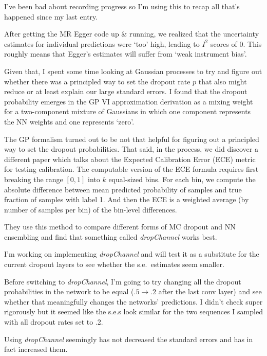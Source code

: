 \begin{Minutes}{}
\maketitle
{}
I've been bad about recording progress so I'm using this to recap all that's happened since my last entry.

After getting the MR Egger code up \& running, we realized that the uncertainty estimates for individual predictions were `too' high, leading to \( I^2 \) scores of 0. This roughly means that Egger's estimates will suffer from `weak instrument bias'.

Given that, I spent some time looking at Gaussian processes to try and figure out whether there was a principled way to set the dropout rate \( p \) that also might reduce or at least explain our large standard errors. I found that the dropout probability emerges in the GP VI approximation derivation as a mixing weight for a two-component mixture of Gaussians in which one component represents the NN weights and one represents `zero'.

The GP formalism turned out to be not that helpful for figuring out a principled way to set the dropout probabilities. That said, in the process, we did discover a different paper which talks about the Expected Calibration Error (ECE) metric for testing calibration. The computable version of the ECE formula requires first breaking the range \( [0, 1] \) into \( k \) equal-sized bins. For each bin, we compute the absolute difference between mean predicted probability of samples and true fraction of samples with label 1. And then the ECE is a weighted average (by number of samples per bin) of the bin-level differences.

They use this method to compare different forms of MC dropout and NN ensembling and find that something called \textit{dropChannel} works best.

I'm working on implementing \textit{dropChannel} and will test it as a substitute for the current dropout layers to see whether the s.e.\ estimates seem smaller.

Before switching to \textit{dropChannel}, I'm going to try changing all the dropout probabilities in the network to be equal (\( .5 \rightarrow .2 \) after the last conv layer) and see whether that meaningfully changes the networks' predictions. I didn't check super rigorously but it seemed like the s.e.s look similar for the two sequences I sampled with all dropout rates set to .2.

Using \textit{dropChannel} seemingly has not decreased the standard errors and has in fact increased them.

\end{Minutes}
